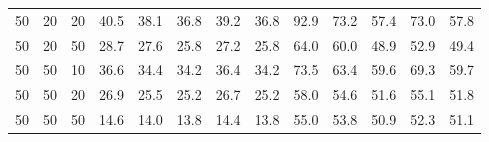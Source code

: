 \begin{table}
\begin{tabular}[t]{rrrrrrrrrrrrr}
50 & 20 & 20 & 40.5 & 38.1 & 36.8 & 39.2 & 36.8 & 92.9 & 73.2 & 57.4 & 73.0 & 57.8\\
50 & 20 & 50 & 28.7 & 27.6 & 25.8 & 27.2 & 25.8 & 64.0 & 60.0 & 48.9 & 52.9 & 49.4\\
50 & 50 & 10 & 36.6 & 34.4 & 34.2 & 36.4 & 34.2 & 73.5 & 63.4 & 59.6 & 69.3 & 59.7\\
50 & 50 & 20 & 26.9 & 25.5 & 25.2 & 26.7 & 25.2 & 58.0 & 54.6 & 51.6 & 55.1 & 51.8\\
50 & 50 & 50 & 14.6 & 14.0 & 13.8 & 14.4 & 13.8 & 55.0 & 53.8 & 50.9 & 52.3 & 51.1\\
\bottomrule
\end{tabular}
\end{table}
